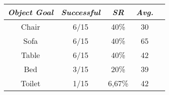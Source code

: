 \begin{table}[t]
    \begin{revisebox}{2.1}
    \centering
    \caption{}
    \label{tab:vlv}
    \begin{tabular}{c|cccc}
        \toprule
        \textit{\textbf{Object Goal}} & \textit{\textbf{Successful}} & \textit{\textbf{SR}} & \textit{\textbf{Avg.}} \\ \midrule
        Chair                         & 6/15                                  & 40\%                 & 30                                       \\
        Sofa                          & 6/15                                  & 40\%                 & 65                                       \\
        Table                         & 6/15                                  & 40\%                 & 42                                       \\
        Bed                           & 3/15                                  & 20\%                 & 39                                       \\
        Toilet                        & 1/15                                  & 6,67\%               & 42                                       \\ \bottomrule
    \end{tabular}
    \end{revisebox}
\end{table}